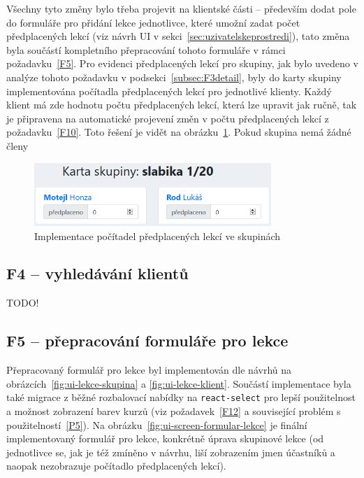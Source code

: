 Všechny tyto změny bylo třeba projevit na klientské části -- především dodat pole do formuláře pro přidání lekce jednotlivce, které umožní zadat počet předplacených lekcí (viz návrh UI v sekci~\ref{sec:uzivatelskeprostredi}), tato změna byla součástí kompletního přepracování tohoto formuláře v rámci požadavku~\ref{F5}. Pro evidenci předplacených lekcí pro skupiny, jak bylo uvedeno v analýze tohoto požadavku v podsekci~\ref{subsec:F3detail}, byly do karty skupiny implementována počítadla předplacených lekcí pro jednotlivé klienty. Každý klient má zde hodnotu počtu předplacených lekcí, která lze upravit jak ručně, tak je připravena na automatické projevení změn v počtu předplacených lekcí z požadavku~\ref{F10}. Toto řešení je vidět na obrázku~\ref{fig:ui-screen-pocitadla}. Pokud skupina nemá žádné členy

\begin{figure}[h]\centering
    \includegraphics[width=0.8\textwidth]{img/ui-screen-pocitadla.png}
    \caption{Implementace počítadel předplacených lekcí ve skupinách}\label{fig:ui-screen-pocitadla}
\end{figure}

\subsection{F4 -- vyhledávání klientů}

TODO!

\subsection{F5 -- přepracování formuláře pro lekce}

Přepracovaný formulář pro lekce byl implementován dle návrhů na obrázcích~\ref{fig:ui-lekce-skupina} a \ref{fig:ui-lekce-klient}. Součástí implementace byla také migrace z běžné rozbalovací nabídky na \verb|react-select| pro lepší použitelnost a možnost zobrazení barev kurzů (viz požadavek~\ref{F12} a související problém s použitelností~\ref{P5}). Na obrázku~\ref{fig:ui-screen-formular-lekce} je finální implementovaný formulář pro lekce, konkrétně úprava skupinové lekce (od jednotlivce se, jak je též zmíněno v návrhu, liší zobrazením jmen účastníků a naopak nezobrazuje počítadlo předplacených lekcí).

